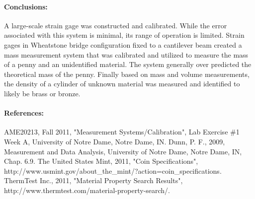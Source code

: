 \documentclass[12pt, letterpaper]{article}
\begin{document}
\paragraph{Conclusions:}
A large-scale strain gage was constructed and
calibrated. While the error associated with this system is minimal, its range
of operation is limited. Strain gages in Wheatstone bridge configuration fixed
to a cantilever beam created a mass measurement system that was calibrated and
utilized to measure the mass of a penny and an unidentified material. The
system generally over predicted the theoretical mass of the penny. Finally
based on mass and volume measurements, the density of a cylinder of unknown
material was measured and identified to likely be brass or bronze.


\paragraph{References:}
\begingroup
   \def\section*#1{}%
\raggedright
\singlespacing
\begin{thebibliography}{}
    AME20213, Fall 2011, "Measurement  Systems/Calibration",
       Lab Exercise \#1 Week A, University of Notre Dame, Notre Dame, IN.
     Dunn, P. F., 2009, Measurement and Data Analysis,
       University of Notre Dame, Notre Dame, IN, Chap. 6.9.
    The United States Mint, 2011, "Coin Specifications",
        http://www.usmint.gov/about\_the\_mint/?action=coin\_specifications.
     ThermTest Inc., 2011, "Material Property Search Results",
        http://www.thermtest.com/material-property-search/.
\end{thebibliography}
\endgroup
\end{document}
